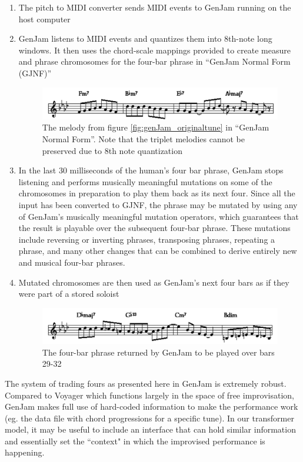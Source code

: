 \documentclass[../main.tex]{subfiles}
\begin{document}
\begin{enumerate}
    \item The pitch to MIDI converter sends MIDI events to GenJam running on the host computer

    \item GenJam listens to MIDI events and quantizes them into 8th-note long windows. It then uses the chord-scale mappings provided to create measure and phrase chromosomes for the four-bar phrase in ``GenJam Normal Form (GJNF)''

    \begin{figure}[htbp]
        \includegraphics[width=1\textwidth,]{imgs/genJam_GJNFtune.png}
        \caption{The melody from figure \ref{fig:genJam_originaltune} in ``GenJam Normal Form''. Note that the triplet melodies cannot be preserved due to 8th note quantization}
        \label{fig:genJam_GJNFtune}
    \end{figure}

    \item In the last 30 milliseconds of the human’s four bar phrase, GenJam stops listening and performs musically meaningful mutations on some of the chromosomes in preparation to play them back as its next four. Since all the input has been converted to GJNF, the phrase may be mutated by using any of GenJam's musically meaningful mutation operators, which guarantees that the result is playable over the subsequent four-bar phrase. These mutations include reversing or inverting phrases, transposing phrases, repeating a phrase, and many other changes that can be combined to derive entirely new and musical four-bar phrases.

    \item Mutated chromosomes are then used as GenJam's next four bars as if they were part of a stored soloist

     \begin{figure}[htbp]
        \includegraphics[width=1\textwidth,]{imgs/genJam_mutatedTune.png}
        \caption{The four-bar phrase returned by GenJam to be played over bars 29-32}
        \label{fig:genJam_mutatedTune}
    \end{figure}
\end{enumerate}

The system of trading fours as presented here in GenJam is extremely robust. Compared to Voyager which functions largely in the space of free improvisation, GenJam makes full use of hard-coded information to make the performance work (eg. the data file with chord progressions for a specific tune). In our transformer model, it may be useful to include an interface that can hold similar information and essentially set the ``context" in which the improvised performance is happening.
\end{document}

